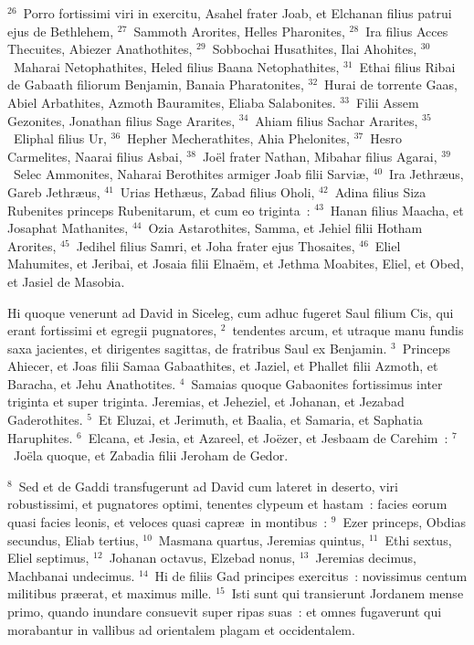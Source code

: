 ${}^{26}$~Porro fortissimi viri in exercitu, Asahel frater Joab, et Elchanan filius patrui ejus de Bethlehem,
${}^{27}$~Sammoth Arorites, Helles Pharonites,
${}^{28}$~Ira filius Acces Thecuites, Abiezer Anathothites,
${}^{29}$~Sobbochai Husathites, Ilai Ahohites,
${}^{30}$~Maharai Netophathites, Heled filius Baana Netophathites,
${}^{31}$~Ethai filius Ribai de Gabaath filiorum Benjamin, Banaia Pharatonites,
${}^{32}$~Hurai de torrente Gaas, Abiel Arbathites, Azmoth Bauramites, Eliaba Salabonites.
${}^{33}$~Filii Assem Gezonites, Jonathan filius Sage Ararites,
${}^{34}$~Ahiam filius Sachar Ararites,
${}^{35}$~Eliphal filius Ur,
${}^{36}$~Hepher Mecherathites, Ahia Phelonites,
${}^{37}$~Hesro Carmelites, Naarai filius Asbai,
${}^{38}$~Jo\"el frater Nathan, Mibahar filius Agarai,
${}^{39}$~Selec Ammonites, Naharai Berothites armiger Joab filii Sarvi\ae ,
${}^{40}$~Ira Jethr\ae us, Gareb Jethr\ae us,
${}^{41}$~Urias Heth\ae us, Zabad filius Oholi,
${}^{42}$~Adina filius Siza Rubenites princeps Rubenitarum, et cum eo triginta~:
${}^{43}$~Hanan filius Maacha, et Josaphat Mathanites,
${}^{44}$~Ozia Astarothites, Samma, et Jehiel filii Hotham Arorites,
${}^{45}$~Jedihel filius Samri, et Joha frater ejus Thosaites,
${}^{46}$~Eliel Mahumites, et Jeribai, et Josaia filii Elna\"em, et Jethma Moabites, Eliel, et Obed, et Jasiel de Masobia.

\lettrine[lines=3,image=true,loversize=0.05,lraise=-0.03]{H}{}i quoque venerunt ad David in Siceleg, cum adhuc fugeret Saul filium Cis, qui erant fortissimi et egregii pugnatores,
${}^{2}$~tendentes arcum, et utraque manu fundis saxa jacientes, et dirigentes sagittas, de fratribus Saul ex Benjamin.
${}^{3}$~Princeps Ahiecer, et Joas filii Samaa Gabaathites, et Jaziel, et Phallet filii Azmoth, et Baracha, et Jehu Anathotites.
${}^{4}$~Samaias quoque Gabaonites fortissimus inter triginta et super triginta. Jeremias, et Jeheziel, et Johanan, et Jezabad Gaderothites.
${}^{5}$~Et Eluzai, et Jerimuth, et Baalia, et Samaria, et Saphatia Haruphites.
${}^{6}$~Elcana, et Jesia, et Azareel, et Jo\"ezer, et Jesbaam de Carehim~:
${}^{7}$~Jo\"ela quoque, et Zabadia filii Jeroham de Gedor.


${}^{8}$~Sed et de Gaddi transfugerunt ad David cum lateret in deserto, viri robustissimi, et pugnatores optimi, tenentes clypeum et hastam~: facies eorum quasi facies leonis, et veloces quasi capre\ae\ in montibus~:
${}^{9}$~Ezer princeps, Obdias secundus, Eliab tertius,
${}^{10}$~Masmana quartus, Jeremias quintus,
${}^{11}$~Ethi sextus, Eliel septimus,
${}^{12}$~Johanan octavus, Elzebad nonus,
${}^{13}$~Jeremias decimus, Machbanai undecimus.
${}^{14}$~Hi de filiis Gad principes exercitus~: novissimus centum militibus pr\ae erat, et maximus mille.
${}^{15}$~Isti sunt qui transierunt Jordanem mense primo, quando inundare consuevit super ripas suas~: et omnes fugaverunt qui morabantur in vallibus ad orientalem plagam et occidentalem.


